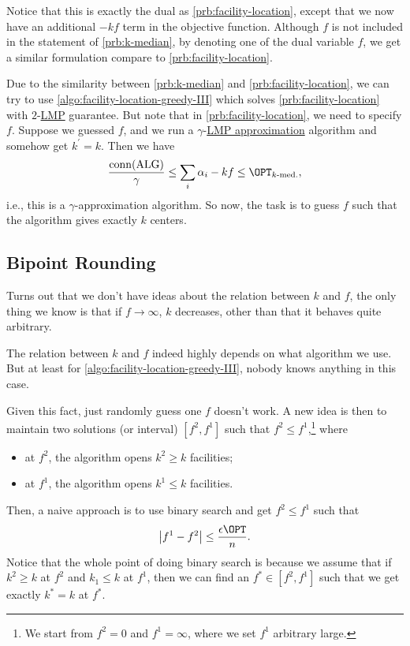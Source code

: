 \begin{note}
	Notice that this is exactly the dual as \autoref{prb:facility-location}, except that we now have an additional \(-kf\) term in the objective function. Although \(f\) is not included in the statement of \autoref{prb:k-median}, by denoting one of the dual variable \(f\), we get a similar formulation compare to \autoref{prb:facility-location}.
\end{note}

Due to the similarity between \autoref{prb:k-median} and \autoref{prb:facility-location}, we can try to use \autoref{algo:facility-location-greedy-III} which solves \autoref{prb:facility-location} with \(2\)-\hyperref[def:LMP]{LMP} guarantee. But note that in \autoref{prb:facility-location}, we need to specify \(f\). Suppose we guessed \(f\), and we run a \(\gamma\)-\hyperref[def:LMP]{LMP approximation} algorithm and somehow get \(k^\prime = k\). Then we have
\[
	\frac{\mathop{\mathrm{conn}}(\mathrm{ALG})}{\gamma } \leq \sum_{i} \alpha _i - kf \leq \OPT_{\text{\(k\)-med.}},
\]
i.e., this is a \(\gamma \)-approximation algorithm. So now, the task is to guess \(f\) such that the algorithm gives exactly \(k\) centers.

\subsection{Bipoint Rounding}
Turns out that we don't have ideas about the relation between \(k\) and \(f\), the only thing we know is that if \(f\to \infty \), \(k\) decreases, other than that it behaves quite arbitrary.

\begin{remark}
	The relation between \(k\) and \(f\) indeed highly depends on what algorithm we use. But at least for \autoref{algo:facility-location-greedy-III}, nobody knows anything in this case.
\end{remark}

Given this fact, just randomly guess one \(f\) doesn't work. A new idea is then to maintain two solutions (or interval) \([f^2, f^1]\) such that \(f^2 \leq f^1\),\footnote{We start from \(f^2 = 0\) and \(f^1 = \infty \), where we set \(f^1\) arbitrary large.} where
\begin{itemize}
	\item at \(f^2\), the algorithm opens \(k^2 \geq k\) facilities;
	\item at \(f^1\), the algorithm opens \(k^1 \leq k\) facilities.
\end{itemize}
Then, a naive approach is to use binary search and get \(f^2 \leq f^1\) such that
\[
	\left\vert f^1 - f^2 \right\vert \leq \frac{\epsilon \OPT}{n}.
\]
Notice that the whole point of doing binary search is because we assume that if \(k^2 \geq k\) at \(f^2\) and \(k_1 \leq k\) at \(f^1\), then we can find an \(f^{\ast} \in [f^2, f^1]\) such that we get exactly \(k^{\ast} = k\) at \(f^{\ast} \).

